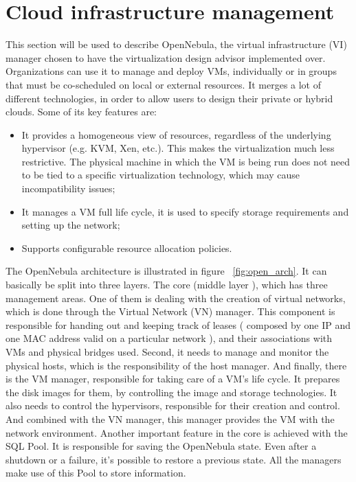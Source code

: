 \chapter{\textbf{Cloud infrastructure management}}
\label{chap:infrastructure}

This section will be used to describe OpenNebula, the virtual infrastructure (VI) manager chosen to have the virtualization design advisor implemented over. Organizations can use it to manage and deploy VMs, individually or in groups that must be co-scheduled on local or external resources. It merges a lot of different technologies, in order to allow users to design their private or hybrid clouds. Some of its key features are:
\begin{itemize}
 \item It provides a homogeneous view of resources, regardless of the underlying hypervisor (e.g. KVM, Xen, etc.). This makes the virtualization much less restrictive. The physical machine in which the VM is being run does not need to be tied to a specific virtualization technology, which may cause incompatibility issues;
  \item It manages a VM full life cycle, it is used to specify storage requirements and setting up the network;
  \item Supports configurable resource allocation policies.
\end{itemize}

The OpenNebula architecture is illustrated in figure ~\ref{fig:open_arch}. It can basically be split into three layers. The core (middle layer ), which has three management areas. One of them is dealing with the creation of virtual networks, which is done through the Virtual Network (VN) manager. This component is responsible for handing out and keeping track of leases ( composed by one IP and one MAC address valid on a particular network ), and their associations with VMs and physical bridges used. Second, it needs to manage and monitor the physical hosts, which is the responsibility of the host manager. And finally, there is the VM manager, responsible for taking care of a VM's life cycle. It prepares the disk images for them, by controlling the image and storage technologies. It also needs to control the hypervisors, responsible for their creation and control. And combined with the VN manager, this manager provides the VM with the network environment. Another important feature in the core is achieved with 
the SQL Pool. It is responsible for saving the OpenNebula state. Even after a shutdown or a failure, it's possible to restore a previous state. All the managers make use of this Pool to store information.


